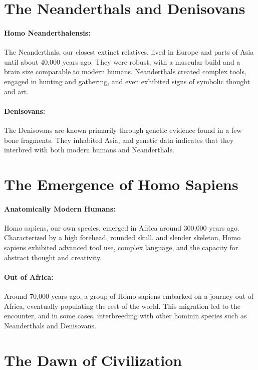\documentclass[a4paper,12pt]{book}
\begin{document}
\section*{The Neanderthals and Denisovans}

\paragraph{Homo Neanderthalensis:}
The Neanderthals, our closest extinct relatives, lived in Europe and parts of Asia until about 40,000 years ago. They were robust, with a muscular build and a brain size comparable to modern humans. Neanderthals created complex tools, engaged in hunting and gathering, and even exhibited signs of symbolic thought and art.

\paragraph{Denisovans:}
The Denisovans are known primarily through genetic evidence found in a few bone fragments. They inhabited Asia, and genetic data indicates that they interbred with both modern humans and Neanderthals.

\section*{The Emergence of Homo Sapiens}

\paragraph{Anatomically Modern Humans:}
Homo sapiens, our own species, emerged in Africa around 300,000 years ago. Characterized by a high forehead, rounded skull, and slender skeleton, Homo sapiens exhibited advanced tool use, complex language, and the capacity for abstract thought and creativity.

\paragraph{Out of Africa:}
Around 70,000 years ago, a group of Homo sapiens embarked on a journey out of Africa, eventually populating the rest of the world. This migration led to the encounter, and in some cases, interbreeding with other hominin species such as Neanderthals and Denisovans.

\section*{The Dawn of Civilization}
\end{document}

